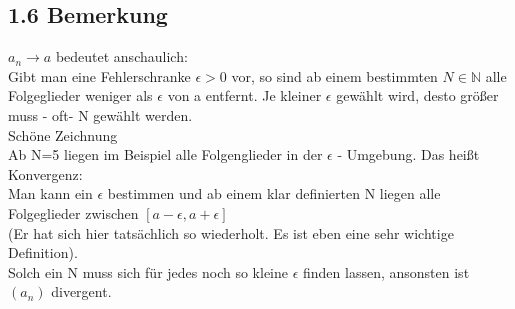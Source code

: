 \documentclass[12pt]{article}
\begin{document}
\subsection*{1.6 Bemerkung}
$a_n \rightarrow a$ bedeutet anschaulich:\\
Gibt man eine Fehlerschranke $\epsilon > 0$ vor, so sind ab einem bestimmten $N\in \mathbb{N}$ alle Folgeglieder weniger als $\epsilon$ von a entfernt. Je kleiner $\epsilon$ gewählt wird, desto größer muss - oft- N gewählt werden. \\

Schöne Zeichnung \\

Ab N=5 liegen im Beispiel alle Folgenglieder in der $\epsilon$ - Umgebung. Das heißt Konvergenz: \\
Man kann ein $\epsilon$ bestimmen und ab einem klar definierten N liegen alle Folgeglieder zwischen $[a-\epsilon, a+\epsilon]$ \\
(Er hat sich hier tatsächlich so wiederholt. Es ist eben eine sehr wichtige Definition).\\
Solch ein N muss sich für jedes noch so kleine $\epsilon$ finden lassen, ansonsten ist $(a_n)$ divergent. 
\end{document}
